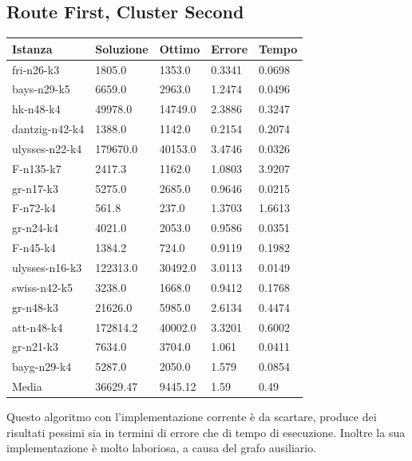 \documentclass[]{article}
\begin{document}
\subsection{Route First, Cluster Second}

\begin{table}[h!]
	\begin{center}	
		\begin{tabular}{||l | l l l l||} 
			\hline
			Istanza & Soluzione & Ottimo & Errore & Tempo \\ [0.5ex] 
			\hline\hline
		fri-n26-k3 & 1805.0 & 1353.0 & 0.3341 & 0.0698  \\
		bays-n29-k5 & 6659.0 & 2963.0 & 1.2474 & 0.0496  \\
		hk-n48-k4 & 49978.0 & 14749.0 & 2.3886 & 0.3247  \\
		dantzig-n42-k4 & 1388.0 & 1142.0 & 0.2154 & 0.2074  \\
		ulysses-n22-k4 & 179670.0 & 40153.0 & 3.4746 & 0.0326  \\
		F-n135-k7 & 2417.3 & 1162.0 & 1.0803 & 3.9207  \\
		gr-n17-k3 & 5275.0 & 2685.0 & 0.9646 & 0.0215  \\
		F-n72-k4 & 561.8 & 237.0 & 1.3703 & 1.6613  \\
		gr-n24-k4 & 4021.0 & 2053.0 & 0.9586 & 0.0351  \\
		F-n45-k4 & 1384.2 & 724.0 & 0.9119 & 0.1982  \\
		ulysses-n16-k3 & 122313.0 & 30492.0 & 3.0113 & 0.0149  \\
		swiss-n42-k5 & 3238.0 & 1668.0 & 0.9412 & 0.1768  \\
		gr-n48-k3 & 21626.0 & 5985.0 & 2.6134 & 0.4474  \\
		att-n48-k4 & 172814.2 & 40002.0 & 3.3201 & 0.6002  \\
		gr-n21-k3 & 7634.0 & 3704.0 & 1.061 & 0.0411  \\
		bayg-n29-k4 & 5287.0 & 2050.0 & 1.579 & 0.0854  \\
		\hline
		Media & 36629.47 & 9445.12 & 1.59 & 0.49  \\	
			[1ex] 
			\hline
		\end{tabular}
	\end{center}
\end{table}

Questo algoritmo con l'implementazione corrente è da scartare, produce dei risultati pessimi sia in termini di errore che di tempo di esecuzione. Inoltre la sua implementazione è molto laboriosa, a causa del grafo ausiliario.
\end{document}
